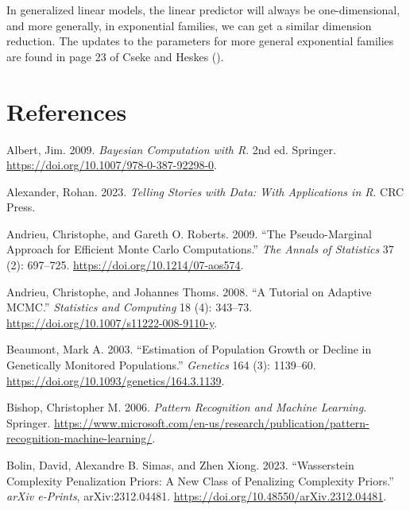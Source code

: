 \documentclass[
  11pt,
  letterpaper,
]{scrbook}
\newlength{\cslhangindent}
\newenvironment{CSLReferences}[2] %
 {\begin{list}{}{%
  \setlength{\itemindent}{0pt}
  \setlength{\leftmargin}{0pt}
  \setlength{\parsep}{0pt}
  \ifodd #1
   \setlength{\leftmargin}{\cslhangindent}
   \setlength{\itemindent}{-1\cslhangindent}
  \fi
  \setlength{\itemsep}{#2\baselineskip}}}
 {\end{list}}
\theoremstyle{definition}
\theoremstyle{plain}
\theoremstyle{plain}
\theoremstyle{plain}
\theoremstyle{definition}
\theoremstyle{definition}
\theoremstyle{plain}
\theoremstyle{plain}
\theoremstyle{remark}
\begin{document}
In generalized linear models, the linear predictor will always be
one-dimensional, and more generally, in exponential families, we can get
a similar dimension reduction. The updates to the parameters for more
general exponential families are found in page 23 of Cseke and Heskes
().


\chapter{References}\label{references}

\protect{}\label{refs}
\begin{CSLReferences}{1}{1}
Albert, Jim. 2009. \emph{Bayesian Computation with {R}}. 2nd ed.
Springer. \url{https://doi.org/10.1007/978-0-387-92298-0}.

Alexander, Rohan. 2023. \emph{Telling Stories with Data: With
Applications in {R}}. CRC Press.

Andrieu, Christophe, and Gareth O. Roberts. 2009. {``The Pseudo-Marginal
Approach for Efficient {M}onte {C}arlo Computations.''} \emph{The Annals
of Statistics} 37 (2): 697--725.
\url{https://doi.org/10.1214/07-aos574}.

Andrieu, Christophe, and Johannes Thoms. 2008. {``A Tutorial on Adaptive
{MCMC}.''} \emph{Statistics and Computing} 18 (4): 343--73.
\url{https://doi.org/10.1007/s11222-008-9110-y}.

Beaumont, Mark A. 2003. {``Estimation of Population Growth or Decline in
Genetically Monitored Populations.''} \emph{Genetics} 164 (3): 1139--60.
\url{https://doi.org/10.1093/genetics/164.3.1139}.

Bishop, Christopher M. 2006. \emph{Pattern Recognition and Machine
Learning}. Springer.
\url{https://www.microsoft.com/en-us/research/publication/pattern-recognition-machine-learning/}.

Bolin, David, Alexandre B. Simas, and Zhen Xiong. 2023. {``{W}asserstein
Complexity Penalization Priors: A New Class of Penalizing Complexity
Priors.''} \emph{arXiv e-Prints}, arXiv:2312.04481.
\url{https://doi.org/10.48550/arXiv.2312.04481}.


\end{CSLReferences}
\end{document}
